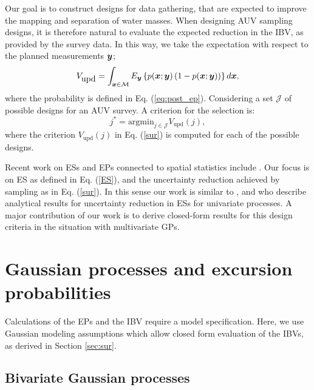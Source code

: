\documentclass[aoas]{imsart}
\begin{document}
Our goal is to construct designs for data gathering, that are expected
to improve the mapping and separation of water masses. When designing
AUV sampling designs, it is therefore natural to evaluate the expected
reduction in the IBV, as provided by the survey data. In this way, we
take the expectation with respect to the planned measurements ${\boldsymbol y}$;
\begin{equation}\label{sur}
    V_{\mbox{upd}} = \int_{\bx \in \mathcal{M}} E_{\by} \left\{ p(\bx;\by)\left( 1-p(\bx;\by)\right) \right\} d\bx, 
\end{equation}
where the probability is defined in Eq. (\ref{eq:post_ep}).
Considering a set $\mathcal{J}$ of possible designs for an AUV survey. A criterion for the selection is:
\begin{equation}\label{crit}
    j^* = \mbox{argmin}_{j \in \mathcal{J}} V_{\mbox{upd}}(j),
\end{equation}
where the criterion $V_{\mbox{upd}}(j)$ in Eq. (\ref{sur}) is computed
for each of the possible designs. 

Recent work on ESs and EPs connected to spatial statistics include
\cite{picheny2010,french2013spatio,bolin2015excursion,french2016credible}.
Our focus is on ES as defined in Eq. (\ref{ES}), and the uncertainty
reduction achieved by sampling as in Eq. (\ref{sur}). In this sense
our work is similar to \cite{bect2012}, \cite{chevalier2014fast} and
\cite{azzimonti2016quantifying} who describe analytical results for
uncertainty reduction in ESs for univariate processes. A major
contribution of our work is to derive closed-form results for this
design criteria in the situation with multivariate GPs.

\section{Gaussian processes and excursion probabilities}
\label{sec:GP_EP}

Calculations of the EPs and the IBV require a model specification.
Here, we use Gaussian modeling assumptions which allow closed form
evaluation of the IBVs, as derived in Section \ref{sec:sur}.

\subsection{Bivariate Gaussian processes}
\end{document}
